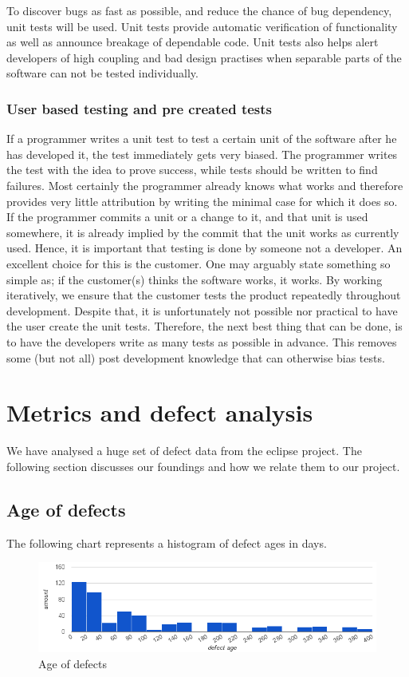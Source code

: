\documentclass{article}
\begin{document}
To discover bugs as fast as possible, and reduce the chance of bug dependency, unit tests will be used.
Unit tests provide automatic verification of functionality as well as announce breakage of dependable code.
Unit tests also helps alert developers of high coupling and bad design practises when separable parts of the software can not be tested individually.

\subsubsection{User based testing and pre created tests}\label{user based testing}
If a programmer writes a unit test to test a certain unit of the software after he has developed it, the test immediately gets very biased.
The programmer writes the test with the idea to prove success, while tests should be written to find failures.
Most certainly the programmer already knows what works and therefore provides very little attribution by writing the minimal case for which it does so. 
If the programmer commits a unit or a change to it, and that unit is used somewhere, it is already implied by the commit that the unit works as currently used.
Hence, it is important that testing is done by someone not a developer.
An excellent choice for this is the customer.
One may arguably state something so simple as; if the customer(s) thinks the software works, it works.
By working iteratively, we ensure that the customer tests the product repeatedly throughout development.
Despite that, it is unfortunately not possible nor practical to have the user create the unit tests.
Therefore, the next best thing that can be done, is to have the developers write as many tests as possible in advance.
This removes some (but not all) post development knowledge that can otherwise bias tests.

\section{Metrics and defect analysis}
We have analysed a huge set of defect data from the eclipse project.
The following section discusses our foundings and how we relate them to our project.

\subsection{Age of defects}
The following chart represents a histogram of defect ages in days.
\begin{figure}[h]
\center
\includegraphics[width=160mm]{defect_ages.png}
\caption{Age of defects}
\end{figure}
\end{document}

